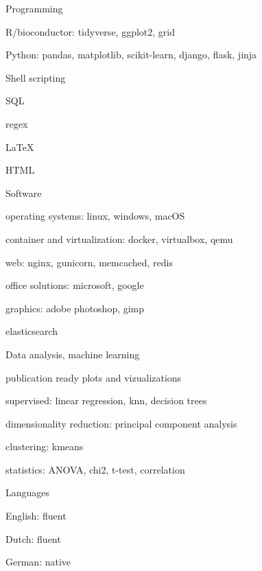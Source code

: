 

\begin{cvskills}
  \cvskill
    {Programming} %
    {
      \begin{cvitems}
        \item R/bioconductor: tidyverse, ggplot2, grid
        \item Python: pandas, matplotlib, scikit-learn, django, flask, jinja
        \item Shell scripting
        \item SQL
        \item regex
        \item LaTeX
        \item HTML
      \end{cvitems}
    }

  \cvskill
    {Software}%
    {
      \begin{cvitems}
        \item operating systems: linux, windows, macOS
        \item container and virtualization: docker, virtualbox, qemu
        \item web: nginx, gunicorn, memcached, redis
        \item office solutions: microsoft, google
        \item graphics: adobe photoshop, gimp
        \item elasticsearch
      \end{cvitems}
    }
\cvskill
{Data analysis, machine learning}%
{
  \begin{cvitems}
    \item publication ready plots and vizualizations 
    \item supervised: linear regression, knn, decision trees
    \item dimensionality reduction: principal component analysis
    \item clustering: kmeans
    \item statistics: ANOVA, chi2, t-test, correlation
  \end{cvitems}
}


  \cvskill
    {Languages} %
    {
      \begin{cvitems}
        \item English: fluent
        \item Dutch: fluent
        \item German: native
      \end{cvitems}
    }

\end{cvskills}
